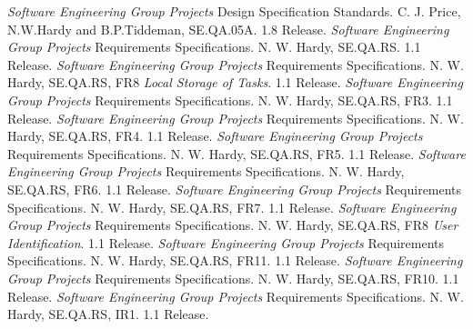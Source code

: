\documentclass{project}
\begin{document}
\begin{thebibliography}{12}
 \emph{Software Engineering Group Projects}
Design Specification Standards.
C. J. Price, N.W.Hardy and B.P.Tiddeman, SE.QA.05A. 1.8 Release.
 \emph{Software Engineering Group Projects}
Requirements Specifications.
N. W. Hardy, SE.QA.RS. 1.1 Release.
 \emph{Software Engineering Group Projects}
Requirements Specifications.
N. W. Hardy, SE.QA.RS, FR8 \emph{Local Storage of Tasks}. 1.1 Release.
 \emph{Software Engineering Group Projects}
Requirements Specifications.
N. W. Hardy, SE.QA.RS, FR3. 1.1 Release.
 \emph{Software Engineering Group Projects}
Requirements Specifications.
N. W. Hardy, SE.QA.RS, FR4. 1.1 Release.
 \emph{Software Engineering Group Projects}
Requirements Specifications.
N. W. Hardy, SE.QA.RS, FR5. 1.1 Release.
 \emph{Software Engineering Group Projects}
Requirements Specifications.
N. W. Hardy, SE.QA.RS, FR6. 1.1 Release.
 \emph{Software Engineering Group Projects}
Requirements Specifications.
N. W. Hardy, SE.QA.RS, FR7. 1.1 Release.
 \emph{Software Engineering Group Projects}
Requirements Specifications.
N. W. Hardy, SE.QA.RS, FR8 \emph{User Identification}. 1.1 Release.
 \emph{Software Engineering Group Projects}
Requirements Specifications.
N. W. Hardy, SE.QA.RS, FR11. 1.1 Release.
 \emph{Software Engineering Group Projects}
Requirements Specifications.
N. W. Hardy, SE.QA.RS, FR10. 1.1 Release.
 \emph{Software Engineering Group Projects}
Requirements Specifications.
N. W. Hardy, SE.QA.RS, IR1. 1.1 Release.
\end{thebibliography}
\clearpage
{}
\end{document}
